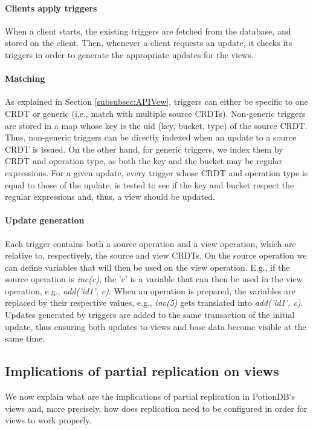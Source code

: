 \documentclass{vldb}
\begin{document}
\paragraph{Clients apply triggers} When a client starts, the existing triggers are fetched from the database, and stored on the client.
Then, whenever a client requests an update, it checks its triggers in order to generate the appropriate updates for the views.

\paragraph{Matching} As explained in Section \ref{subsubsec:APIVew}, triggers can either be specific to one CRDT or generic (i.e., match with multiple source CRDTs).
Non-generic triggers are stored in a map whose key is the uid (key, bucket, type) of the source CRDT.
Thus, non-generic triggers can be directly indexed when an update to a source CRDT is issued.
On the other hand, for generic triggers, we index them by CRDT and operation type, as both the key and the bucket may be regular expressions.
For a given update, every trigger whose CRDT and operation type is equal to those of the update, is tested to see if the key and bucket respect the regular expressions and, thus, a view should be updated.

\paragraph{Update generation}
Each trigger contains both a source operation and a view operation, which are relative to, respectively, the source and view CRDTs.
On the source operation we can define variables that will then be used on the view operation. E.g., if the source operation is \emph{inc(c)}, the 'c' is a variable that can then be used in the view operation, e.g., \emph{add('id1', c)}.
When an operation is prepared, the variables are replaced by their respective values, e.g., \emph{inc(5)} gets translated into \emph{add('id1', c)}.
Updates generated by triggers are added to the same transaction of the initial update, thus ensuring both updates to views and base data become visible at the same time.

\subsection{Implications of partial replication  on views}

We now explain what are the implications of partial replication in PotionDB's views and, more precisely, how does replication need to be configured in order for views to work properly.
\end{document}
